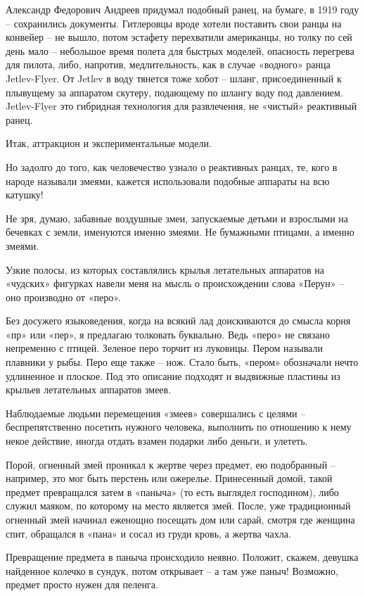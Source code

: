 Александр Федорович Андреев придумал подобный ранец, на бумаге, в 1919 году – сохранились документы. Гитлеровцы вроде хотели поставить свои ранцы на конвейер – не вышло, потом эстафету перехватили американцы, но толку по сей день мало – небольшое время полета для быстрых моделей, опасность перегрева для пилота, либо, напротив, медлительность, как в случае «водного» ранца Jetlev-Flyer. От Jetlev в воду тянется тоже хобот – шланг, присоединенный к плывущему за аппаратом скутеру, подающему по шлангу воду под давлением. Jetlev-Flyer это гибридная технология для развлечения, не «чистый» реактивный ранец.

Итак, аттракцион и экспериментальные модели.

Но задолго до того, как человечество узнало о реактивных ранцах, те, кого в народе называли змеями, кажется использовали подобные аппараты на всю катушку!

Не зря, думаю, забавные воздушные змеи, запускаемые детьми и взрослыми на бечевках с земли, именуются именно змеями. Не бумажными птицами, а именно змеями.

Узкие полосы, из которых составлялись крылья летательных аппаратов на «чудских» фигурках навели меня на мысль о происхождении слова «Перун» – оно производно от «перо». 

Без досужего языковедения, когда на всякий лад доискиваются до смысла корня «пр» или «пер», я предлагаю толковать буквально. Ведь «перо» не связано непременно с птицей. Зеленое перо торчит из луковицы. Пером называли плавники у рыбы. Перо еще также – нож. Стало быть, «пером» обозначали нечто удлиненное и плоское. Под это описание подходят и выдвижные пластины из крыльев летательных аппаратов змеев.

Наблюдаемые людьми перемещения «змеев» совершались с целями – беспрепятственно посетить нужного человека, выполнить по отношению к нему некое действие, иногда отдать взамен подарки либо деньги, и улететь.

Порой, огненный змей проникал к жертве через предмет, ею подобранный – например, это мог быть перстень или ожерелье. Принесенный домой, такой предмет превращался затем в «паныча» (то есть  выглядел господином), либо служил маяком, по которому на место является змей. После, уже традиционный огненный змей начинал еженощно посещать дом или сарай, смотря где женщина спит, обращался в «пана» и сосал из груди кровь, а жертва чахла. 

Превращение предмета в паныча происходило неявно. Положит, скажем, девушка найденное колечко в сундук, потом открывает – а там уже паныч! Возможно, предмет просто нужен для пеленга.

